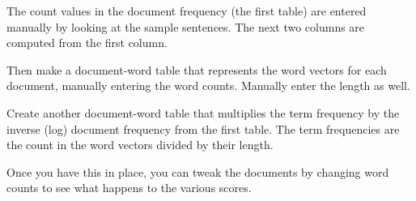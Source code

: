 \documentclass[10pt]{article}
\begin{document}
\begin{figure}[H]
\begin{center}
\label{default}
\end{center}
\end{figure}

The count values in the document frequency (the first table) are entered manually by looking at the sample sentences. The next two columns are computed from the first column.

Then make a document-word table that represents the word vectors for each document, manually entering the word counts. Manually enter the length as well.

Create another document-word table that multiplies the term frequency by the inverse (log) document frequency from the first table. The term frequencies are the count in the word vectors divided by their length.

Once you have this in place, you can tweak the documents by changing word counts to see what happens to the various scores.
\end{document}
